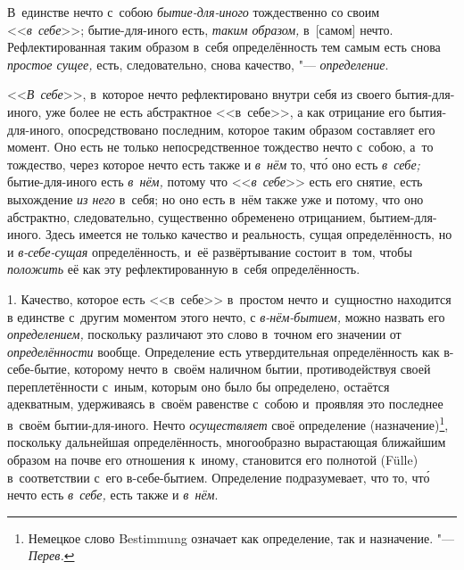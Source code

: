В~единстве нечто с~собою {\em бытие-для-иного}
тождественно со своим <<{\em в~себе}>>; бытие-для-иного
есть, {\em таким образом,} в~[самом] нечто.
Рефлектированная таким образом в~себя определённость тем самым есть снова
{\em простое сущее,} есть, следовательно, снова
качество, "--- {\em определение}.


<<{\em В~себе}>>, в~которое нечто рефлектировано внутри
себя из своего бытия-для-иного, уже более не есть абстрактное <<в~себе>>,
а как отрицание его бытия-для-иного, опосредствовано последним, которое
таким образом составляет его момент. Оно есть не только непосредственное
тождество нечто с~собою, а~то тождество, через которое нечто есть также и
{\em в~нём} то, чт\'{о} оно есть {\em в~себе;}
бытие-для-иного есть {\em в~нём,} потому что
<<{\em в~себе}>> есть его снятие, есть выхождение
{\em из него} в~себя; но оно есть в~нём также уже и
потому, что оно абстрактно, следовательно, существенно обременено
отрицанием, бытием-для-иного. Здесь имеется не только качество и
реальность, сущая определённость, но и
{\em в-себе-сущая} определённость, и~её развёртывание
состоит в~том, чтобы {\em положить} её как эту
рефлектированную в~себя определённость.

1. Качество, которое есть <<в~себе>> в~простом нечто и~сущностно находится в
единстве с~другим моментом этого нечто, с {\em в-нём-бытием,} можно назвать его
{\em определением,} поскольку различают это слово в~точном его значении от
{\em определённости} вообще. Определение есть утвердительная определённость как
в-себе-бытие, которому нечто в~своём наличном бытии, противодействуя своей
переплетённости с~иным, которым оно было бы определено, остаётся адекватным,
удерживаясь в~своём равенстве с~собою и~проявляя это последнее в~своём
бытии-для-иного. Нечто {\em осуществляет} своё определение
(назначение)\footnote{Немецкое слово Bestimmung означает как определение, так и
назначение. "--- {\em Перев.}}, поскольку дальнейшая определённость,
многообразно вырастающая ближайшим образом на почве его отношения к~иному,
становится его полнотой (Fülle) в~соответствии с~его в-себе-бытием. Определение
подразумевает, что то, чт\'{о} нечто есть {\em в~себе,} есть также и
{\em в~нём}.

